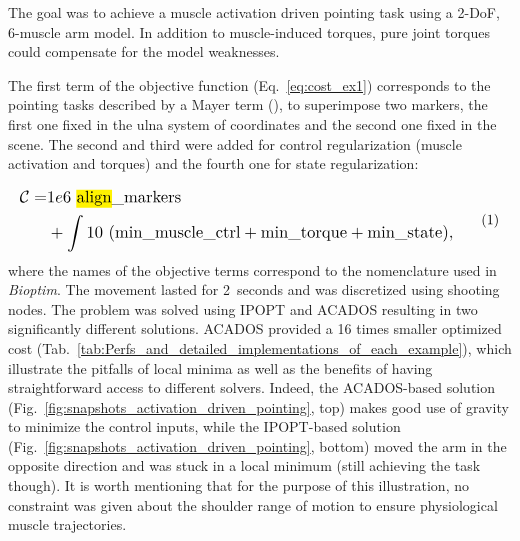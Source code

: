 The goal was to achieve a muscle activation driven pointing task using a 2-DoF, 6-muscle arm model. 
In addition to muscle-induced torques, pure joint torques could compensate for the model weaknesses.

The first term of the objective function (Eq.~\ref{eq:cost_ex1}) corresponds to the pointing tasks described by a Mayer term (), to superimpose two markers, the first one fixed in the ulna system of coordinates and the second one fixed in the scene.
The second and third were added for control regularization (muscle activation and torques) and the fourth one for state regularization:

%
%
\[
\resizebox{0.9\columnwidth}{!}{$
\begin{aligned}
	\mathcal{C} = &1e6~\text{\comment{align}{Selon Jenn, track serait un meilleur choix de mot}\_markers}\\
	&+ \int 10~(\text{min\_muscle\_ctrl}+\text{min\_torque}+\text{min\_state}),
\end{aligned}
$}
\addtag
\label{eq:cost_ex1}
\]
%
\noindent where the names of the objective terms correspond to the nomenclature used in \textit{Bioptim}.
The movement lasted for 2~seconds and was discretized using  shooting nodes.
The problem was solved using IPOPT and ACADOS resulting in two significantly different solutions.
ACADOS provided a 16 times smaller optimized cost (Tab.~\ref{tab:Perfs_and_detailed_implementations_of_each_example}), which illustrate the pitfalls of local minima as well as the benefits of having straightforward access to different solvers.  
Indeed, the ACADOS-based solution (Fig.~\ref{fig:snapshots_activation_driven_pointing}, top) makes good use of gravity to minimize the control inputs, while the IPOPT-based solution (Fig.~\ref{fig:snapshots_activation_driven_pointing}, bottom) moved the arm in the opposite direction and was stuck in a local minimum (still achieving the task though). 
It is worth mentioning that for the purpose of this illustration, no constraint was given about the shoulder range of motion to ensure physiological muscle trajectories. 

